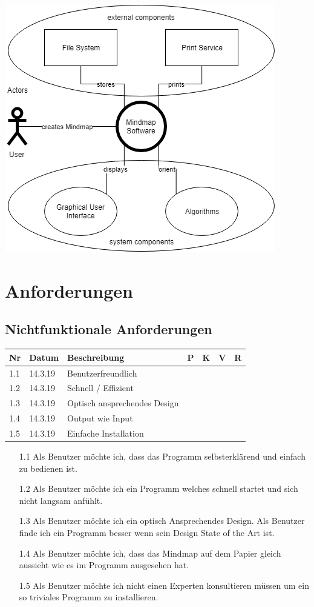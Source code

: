 \documentclass[a4paper,parskip]{scrartcl}
\begin{document}
\includegraphics[width=0.5\linewidth]{Systemkontext.png}

\newpage

\section{Anforderungen}

\subsection{Nichtfunktionale Anforderungen}

\begin{table}[h]

\begin{tabular}{|l|l|l|l|l|l|l|}

\hline
Nr  & Datum   & Beschreibung                 & P & K & V & R \\ \hline
1.1 & 14.3.19 & Benutzerfreundlich           &   &   &   &   \\ \hline
1.2 & 14.3.19 & Schnell / Effizient          &   &   &   &   \\ \hline
1.3 & 14.3.19 & Optisch ansprechendes Design &   &   &   &   \\ \hline
1.4 & 14.3.19 & Output wie Input             &   &   &   &   \\ \hline
1.5 & 14.3.19 & Einfache Installation        &   &   &   &   \\ \hline
\end{tabular}
\end{table}

\begin{enumerate}
\item [1.1] Als Benutzer möchte ich, dass das Programm selbsterklärend und einfach zu bedienen ist.
\item [1.2] Als Benutzer möchte ich ein Programm welches schnell startet und sich nicht langsam anfühlt.
\item [1.3] Als Benutzer möchte ich ein optisch Ansprechendes Design. Als Benutzer finde ich ein Programm
besser wenn sein Design State of the Art ist.
\item [1.4] Als Benutzer möchte ich, dass das Mindmap auf dem Papier gleich aussieht wie es im Programm ausgesehen hat.
\item [1.5] Als Benutzer möchte ich nicht einen Experten konsultieren müssen um ein so triviales Programm zu installieren. 
\end{enumerate}
\end{document}
